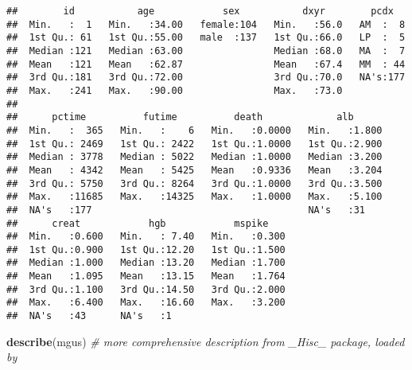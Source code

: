 \documentclass[]{book}
\newenvironment{Shaded}{\begin{snugshade}}{\end{snugshade}}
\newcommand{\KeywordTok}[1]{\textcolor[rgb]{0.13,0.29,0.53}{\textbf{{#1}}}}
\newcommand{\CommentTok}[1]{\textcolor[rgb]{0.56,0.35,0.01}{\textit{{#1}}}}
\newcommand{\NormalTok}[1]{{#1}}
\theoremstyle{definition}
\theoremstyle{definition}
\theoremstyle{definition}
\theoremstyle{remark}
\begin{document}
\begin{verbatim}
##        id           age            sex           dxyr        pcdx    
##  Min.   :  1   Min.   :34.00   female:104   Min.   :56.0   AM  :  8  
##  1st Qu.: 61   1st Qu.:55.00   male  :137   1st Qu.:66.0   LP  :  5  
##  Median :121   Median :63.00                Median :68.0   MA  :  7  
##  Mean   :121   Mean   :62.87                Mean   :67.4   MM  : 44  
##  3rd Qu.:181   3rd Qu.:72.00                3rd Qu.:70.0   NA's:177  
##  Max.   :241   Max.   :90.00                Max.   :73.0             
##                                                                      
##      pctime          futime          death             alb       
##  Min.   :  365   Min.   :    6   Min.   :0.0000   Min.   :1.800  
##  1st Qu.: 2469   1st Qu.: 2422   1st Qu.:1.0000   1st Qu.:2.900  
##  Median : 3778   Median : 5022   Median :1.0000   Median :3.200  
##  Mean   : 4342   Mean   : 5425   Mean   :0.9336   Mean   :3.204  
##  3rd Qu.: 5750   3rd Qu.: 8264   3rd Qu.:1.0000   3rd Qu.:3.500  
##  Max.   :11685   Max.   :14325   Max.   :1.0000   Max.   :5.100  
##  NA's   :177                                      NA's   :31     
##      creat            hgb            mspike     
##  Min.   :0.600   Min.   : 7.40   Min.   :0.300  
##  1st Qu.:0.900   1st Qu.:12.20   1st Qu.:1.500  
##  Median :1.000   Median :13.20   Median :1.700  
##  Mean   :1.095   Mean   :13.15   Mean   :1.764  
##  3rd Qu.:1.100   3rd Qu.:14.50   3rd Qu.:2.000  
##  Max.   :6.400   Max.   :16.60   Max.   :3.200  
##  NA's   :43      NA's   :1
\end{verbatim}

\begin{Shaded}
\begin{Highlighting}[]
\KeywordTok{describe}\NormalTok{(mgus)   }\CommentTok{# more comprehensive description from _Hisc_ package, loaded by}
\end{Highlighting}
\end{Shaded}
\end{document}
